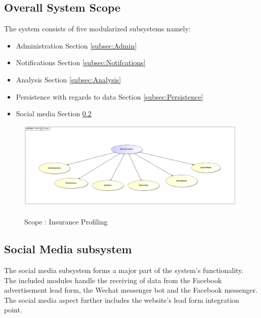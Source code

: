 \documentclass{article}
\begin{document}
	\subsection{Overall System Scope}
	The system consists of five modularized subsystems namely:
	\begin{itemize}
		\item Administration Section \ref{subsec:Admin}
		\item Notifications Section \ref{subsec:Notifcations}
		\item Analysis Section \ref{subsec:Analysis}
		\item Persistence with regards to data Section \ref{subsec:Persistence}
		\item Social media Section \ref{subsec:SocialMedia}
	\end{itemize}
		\begin{figure}[H]
		\includegraphics[width=\textwidth]{images/uc__insuranceProfiling__scope2.jpg}  \\
		\caption{Scope : Insurance Profiling}
		\end{figure}
		
		
		\pagebreak
	\subsection{Social Media subsystem}\label{subsec:SocialMedia}
	The social media subsystem forms a major part of the system's functionality. \\The included modules handle the receiving of data from the Facebook advertisement lead form, the Wechat messenger bot and the Facebook messenger. The social media aspect further includes the website's lead form integration point.\\
\end{document}
